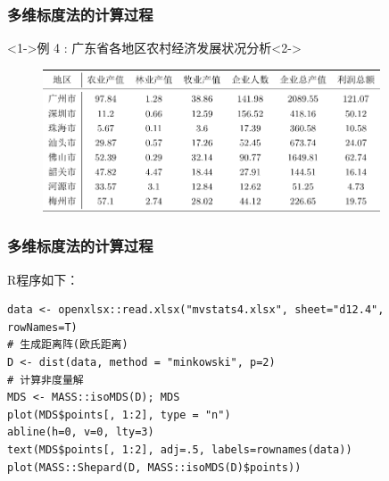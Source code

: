 \documentclass[UTF8, compress]{ctexbeamer}
\begin{document}
	
	\begin{frame}
		\frametitle{\heiti 多维标度法的计算过程}
		\begin{exampleblock}<1->{\heiti 例 4 : 广东省各地区农村经济发展状况分析}<2->
			\pause
			\begin{figure}
				\centering
				\includegraphics[width=10cm]{figures/tabular4}
			\end{figure}
			
		\end{exampleblock}
	\end{frame}
	
	
	\begin{frame}[fragile]
	\frametitle{\heiti 多维标度法的计算过程}
	
\pause

	{\Large R程序如下：}
	
\pause
\begin{lstlisting}[style=A]
data <- openxlsx::read.xlsx("mvstats4.xlsx", sheet="d12.4", rowNames=T)
# 生成距离阵(欧氏距离)
D <- dist(data, method = "minkowski", p=2)
# 计算非度量解
MDS <- MASS::isoMDS(D); MDS
plot(MDS$points[, 1:2], type = "n")
abline(h=0, v=0, lty=3)
text(MDS$points[, 1:2], adj=.5, labels=rownames(data))
plot(MASS::Shepard(D, MASS::isoMDS(D)$points))
\end{lstlisting}
	\end{frame}
	
\end{document}
